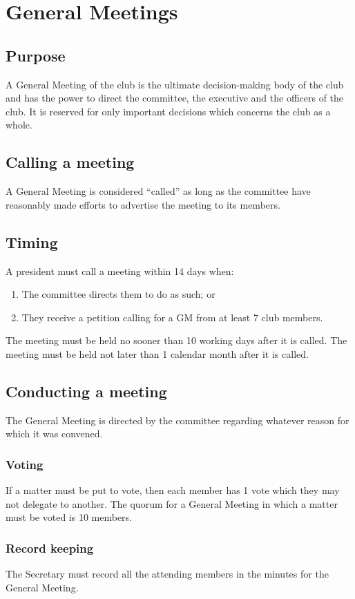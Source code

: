 \documentclass[11pt]{article}
\begin{document}
\section{General Meetings} \label{generalMeetings}
\subsection{Purpose}
A General Meeting of the club is the ultimate decision-making body of the club and has the power to direct the committee, the executive and the officers of the club. It is reserved for only important decisions which concerns the club as a whole.
\subsection{Calling a meeting}
A General Meeting is considered “called” as long as the committee have reasonably made efforts to advertise the meeting to its members.
\subsection{Timing}
A president must call a meeting within 14 days when:
\begin{enumerate}
    \item The committee directs them to do as such; or
    \item They receive a petition calling for a GM from at least 7 club members.
\end{enumerate}
The meeting must be held no sooner than 10 working days after it is called.
The meeting must be held not later than 1 calendar month after it is called.
\subsection{Conducting a meeting}
The General Meeting is directed by the committee regarding whatever reason for which it was convened.
\subsubsection{Voting}
If a matter must be put to vote, then each member has 1 vote which they may not delegate to another. The quorum for a General Meeting in which a matter must be voted is 10 members.
\subsubsection{Record keeping}
The Secretary must record all the attending members in the minutes for the General Meeting.
\end{document}
